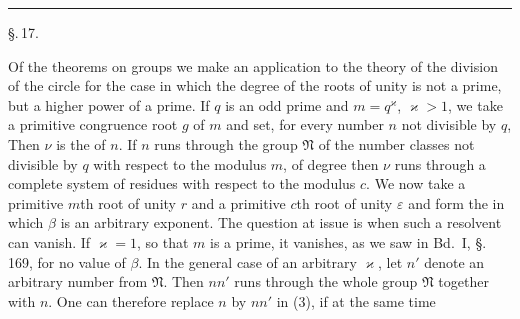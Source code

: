 \begin{center}


\rule{3cm}{0.4pt}

\S.\,17.

\end{center}

Of the theorems on  groups we make an
application to the theory of the division of the circle for the case in which the
degree of the roots of unity is not a prime, but a
higher power of a prime. If $q$ is an odd prime
and $m = q^{\varkappa}$, $\varkappa > 1$, we take a primitive congruence root
 $g$ of $m$ and set, for every number $n$ not divisible
 by $q$,
Then $\nu$ is the  of $n$. If $n$ runs through the group $\mathfrak{N}$
of the number classes not divisible by $q$ with respect to the modulus $m$,
of degree
then $\nu$ runs through a complete system of residues with respect to the modulus $c$. We
now take a primitive $m$th root of unity $r$ and a primitive
 $c$th root of unity $\varepsilon$ and form the 
in which $\beta$ is an arbitrary exponent. The question at issue is
when such a resolvent can vanish. If
$\varkappa = 1$, so that $m$ is a prime, it vanishes, as we saw in
Bd.\ I, \S.\,169, for no value of $\beta$. In the general
 case of an arbitrary $\varkappa$, let $n'$ denote an arbitrary number
from $\mathfrak{N}$. Then $n n'$ runs through the whole group $\mathfrak{N}$ together with $n$.
One can therefore replace $n$ by $n n'$ in (3), if at the same time
